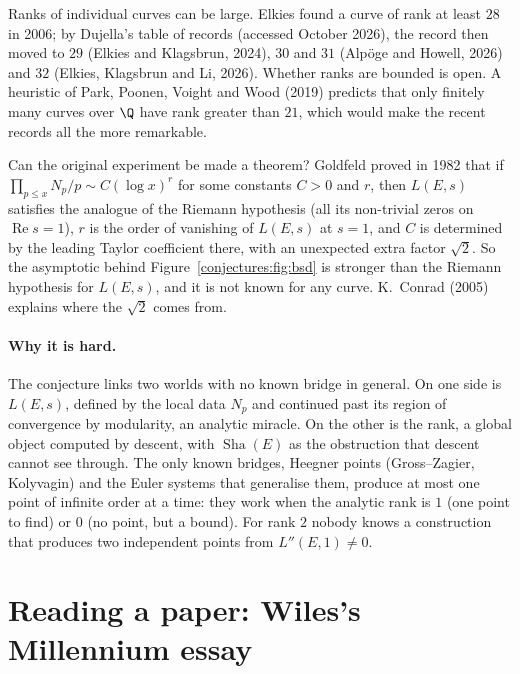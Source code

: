 \begin{remark}[records]\label{conjectures:rem:records}
Ranks of individual curves can be large. Elkies found a curve of rank at least $28$ in 2006; by Dujella's table of records (accessed October 2026), the record
then moved to $29$ (Elkies and Klagsbrun, 2024), $30$ and $31$ (Alp\"oge and Howell, 2026) and $32$ (Elkies, Klagsbrun and Li, 2026). Whether ranks are bounded
is open. A heuristic of Park, Poonen, Voight and Wood (2019) predicts that only finitely many curves over $\Q$ have rank greater than $21$, which would
make the recent records all the more remarkable.
\end{remark}

\begin{remark}\label{conjectures:rem:goldfeld}
Can the original experiment be made a theorem? Goldfeld proved in 1982 that if $\prod_{p\le x}N_p/p\sim C(\log x)^r$ for some constants $C>0$ and $r$, then
$L(E,s)$ satisfies the analogue of the Riemann hypothesis (all its non-trivial zeros on $\operatorname{Re}s=1$), $r$ is the order of vanishing of $L(E,s)$ at
$s=1$, and $C$ is determined by the leading Taylor coefficient there, with an unexpected extra factor $\sqrt2$. So the asymptotic behind
Figure~\ref{conjectures:fig:bsd} is stronger than the Riemann hypothesis for $L(E,s)$, and it is not known for any curve. K.~Conrad (2005) explains where the
$\sqrt2$ comes from.
\end{remark}

\paragraph{Why it is hard.} The conjecture links two worlds with no known bridge in general. On one side is $L(E,s)$, defined by the local data $N_p$ and
continued past its region of convergence by modularity, an analytic miracle. On the other is the rank, a global object computed by descent, with $\operatorname{Sha}(E)$ as the
obstruction that descent cannot see through. The only known bridges, Heegner points (Gross--Zagier, Kolyvagin) and the Euler systems that generalise them,
produce at most one point of infinite order at a time: they work when the analytic rank is $1$ (one point to find) or $0$ (no point, but a bound). For
rank $2$ nobody knows a construction that produces two independent points from $L''(E,1)\ne0$.

\section{Reading a paper: Wiles's Millennium essay}

